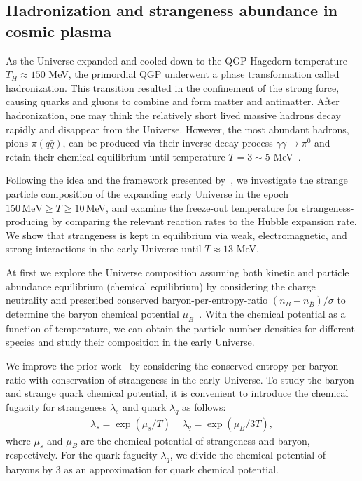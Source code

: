 \subsection{Hadronization and strangeness abundance in cosmic plasma}
\label{Strangeness}
As the Universe expanded and cooled down to the  QGP Hagedorn temperature $T_H\approx150$ MeV, the primordial QGP underwent a phase transformation called hadronization. This transition resulted in the confinement of the strong force, causing quarks and gluons to combine and form matter 
and antimatter. After hadronization, one may think the relatively short lived massive hadrons decay rapidly and disappear from the Universe. However, the most abundant hadrons, pions $\pi(q\bar q)$, can be produced via their inverse decay process $\gamma\gamma\rightarrow\pi^0$ and retain their chemical equilibrium until temperature $T=3\sim5$ MeV~\cite{Kuznetsova:2008jt}. 

Following the idea and the framework presented by~\cite{Kuznetsova:2008jt}, we investigate the strange particle composition of the expanding early Universe in the epoch $150\,\mathrm{MeV}\ge T\ge 10$\,MeV, and examine the freeze-out temperature for strangeness-producing  by comparing the relevant reaction rates to the Hubble expansion rate. We show that strangeness is kept in equilibrium via weak, electromagnetic, and strong interactions in the early Universe until $T\approx13$ MeV.

At first we explore the Universe composition assuming both kinetic and particle abundance equilibrium (chemical equilibrium) by considering the charge neutrality and prescribed conserved baryon-per-entropy-ratio ${(n_B-n_{\overline{B}})}/{\sigma}$ to determine the baryon chemical potential $\mu_B$~\cite{Fromerth:2012fe,Rafelski:2013yka}. With the chemical potential as a function of temperature, we can obtain the particle number densities for different species and study their composition in the early Universe.

We improve the prior work~\cite{Fromerth:2012fe} by considering the conserved entropy per baryon ratio with conservation of strangeness in the early Universe. To study the baryon and strange quark chemical potential, it is convenient to introduce the chemical fugacity for strangeness $\lambda_s$ and quark $\lambda_q$ as follows:
\begin{align}
\lambda_s=\exp(\mu_s/T)\,\quad \lambda_q=\exp(\mu_B/3T),
\end{align}
where $\mu_s$ and $\mu_B$ are the chemical potential of strangeness and baryon, respectively. For the quark fagucity $\lambda_q$, we divide the chemical potential of baryons by 3 as an approximation for quark chemical potential. 

